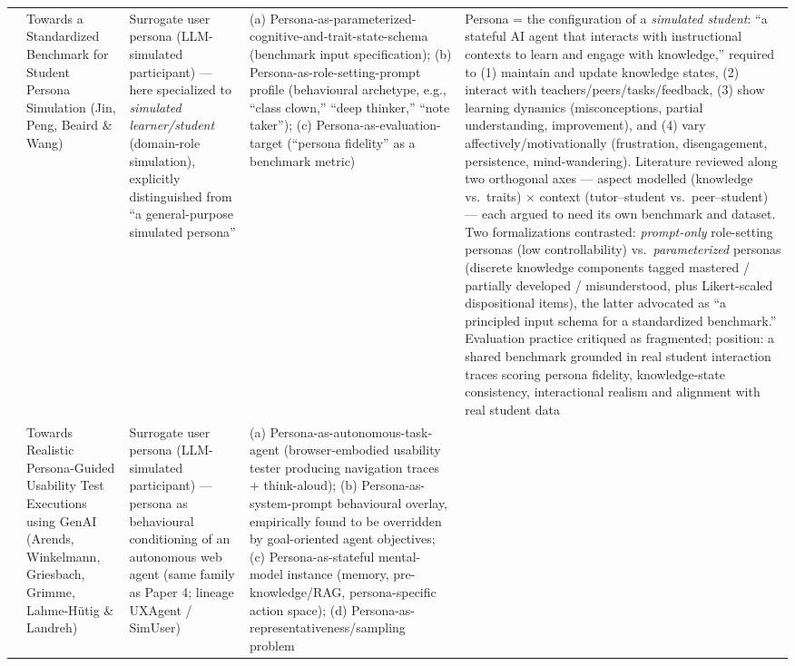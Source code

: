\begin{table}[t]
\begin{tabular}{p{0.5cm} p{3.6cm} p{3.4cm} p{3.6cm} p{3.6cm}}
\addlinespace
12 & Towards a Standardized Benchmark for Student Persona Simulation (Jin, Peng, Beaird \& Wang) &
Surrogate user persona (LLM-simulated participant) --- here specialized to \emph{simulated learner/student} (domain-role simulation), explicitly distinguished from ``a general-purpose simulated persona'' &
(a) Persona-as-parameterized-cognitive-and-trait-state-schema (benchmark input specification); (b) Persona-as-role-setting-prompt profile (behavioural archetype, e.g., ``class clown,'' ``deep thinker,'' ``note taker''); (c) Persona-as-evaluation-target (``persona fidelity'' as a benchmark metric) &
Persona = the configuration of a \emph{simulated student}: ``a stateful AI agent that interacts with instructional contexts to learn and engage with knowledge,'' required to (1) maintain and update knowledge states, (2) interact with teachers/peers/tasks/feedback, (3) show learning dynamics (misconceptions, partial understanding, improvement), and (4) vary affectively/motivationally (frustration, disengagement, persistence, mind-wandering). Literature reviewed along two orthogonal axes --- aspect modelled (knowledge vs.\ traits) $\times$ context (tutor--student vs.\ peer--student) --- each argued to need its own benchmark and dataset. Two formalizations contrasted: \emph{prompt-only} role-setting personas (low controllability) vs.\ \emph{parameterized} personas (discrete knowledge components tagged mastered / partially developed / misunderstood, plus Likert-scaled dispositional items), the latter advocated as ``a principled input schema for a standardized benchmark.'' Evaluation practice critiqued as fragmented; position: a shared benchmark grounded in real student interaction traces scoring persona fidelity, knowledge-state consistency, interactional realism and alignment with real student data \\
\addlinespace
13 & Towards Realistic Persona-Guided Usability Test Executions using GenAI (Arends, Winkelmann, Griesbach, Grimme, Lahme-Hütig \& Landreh) &
Surrogate user persona (LLM-simulated participant) --- persona as behavioural conditioning of an autonomous web agent (same family as Paper 4; lineage UXAgent / SimUser) &
(a) Persona-as-autonomous-task-agent (browser-embodied usability tester producing navigation traces + think-aloud); (b) Persona-as-system-prompt behavioural overlay, empirically found to be overridden by goal-oriented agent objectives; (c) Persona-as-stateful mental-model instance (memory, pre-knowledge/RAG, persona-specific action space); (d) Persona-as-representativeness/sampling problem &

\end{tabular}
\end{table}
